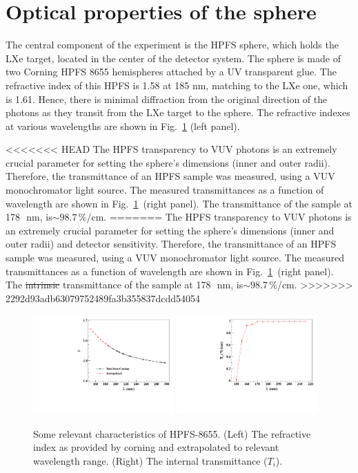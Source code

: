 \section{Optical properties of the sphere }
\label{sec:opt}

The central component of the experiment is the HPFS sphere, which holds the LXe target, located in the center 
of the detector system. The sphere is made of two Corning HPFS 8655 hemispheres attached by a UV transparent glue. 
The refractive index of this HPFS is 1.58 at 185 nm, matching to the LXe one, which is 1.61. Hence, there is minimal 
diffraction from the original direction of the photons as they transit from the LXe target to the sphere. The refractive 
indexes at various wavelengths are shown in Fig.~\ref{fig:hpfsRIcalibration} (left panel).


<<<<<<< HEAD
The HPFS transparency to VUV photons is an extremely crucial parameter for setting the sphere's dimensions (inner and outer radii). 
Therefore, the transmittance of an HPFS sample was measured, using a VUV monochromator light source. 
The measured transmittances as a function of wavelength are shown in Fig.~\ref{fig:hpfsRIcalibration}~(right panel). The 
transmittance of the sample at 178~\,nm, is$\sim98.7$\,\%/cm.  
=======
The HPFS transparency to VUV photons is an extremely crucial parameter for setting the sphere's dimensions (inner and outer radii) and detector sensitivity. Therefore, the transmittance of an HPFS sample was measured, using a VUV monochromator light source. 
The measured transmittances as a function of wavelength are shown in Fig.~\ref{fig:hpfsRIcalibration}~(right panel). The \sout{intrinsic} transmittance of the sample at 178~\,nm, is$\sim98.7$\,\%/cm.  
>>>>>>> 2292d93adb63079752489fa3b355837dcdd54054

\begin{figure}[h]
   \centering
   \includegraphics[width=0.48\textwidth]{RI-calibration.pdf}
    \includegraphics[width=0.48\textwidth]{IntTransmittance.pdf}
   \caption{Some relevant characteristics of HPFS-8655. (Left) The refractive index as provided by corning and 
   extrapolated to relevant wavelength range. (Right) The internal transmittance ($T_{i}$).} 
   \label{fig:hpfsRIcalibration}
\end{figure}


